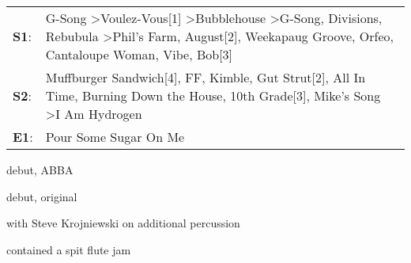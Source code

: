 {\begin{supertabular}{p{0.03\textwidth}p{0.97\textwidth}}
 \textbf{S1}:  &  G-Song\textsuperscript{} \textgreater \enspace Voulez-Vous[1]\textsuperscript{} \textgreater \enspace Bubblehouse\textsuperscript{} \textgreater \enspace G-Song\textsuperscript{}, \enspace Divisions\textsuperscript{}, \enspace Rebubula\textsuperscript{} \textgreater \enspace Phil's Farm\textsuperscript{}, \enspace August[2]\textsuperscript{}, \enspace Weekapaug Groove\textsuperscript{}, \enspace Orfeo\textsuperscript{}, \enspace Cantaloupe Woman\textsuperscript{}, \enspace Vibe\textsuperscript{}, \enspace Bob[3]\textsuperscript{}  \enspace  \\
 \textbf{S2}:  &                                                                                                                                                                   Muffburger Sandwich[4]\textsuperscript{}, \enspace FF\textsuperscript{}, \enspace Kimble\textsuperscript{}, \enspace Gut Strut[2]\textsuperscript{}, \enspace All In Time\textsuperscript{}, \enspace Burning Down the House\textsuperscript{}, \enspace 10th Grade[3]\textsuperscript{}, \enspace Mike's Song\textsuperscript{} \textgreater \enspace I Am Hydrogen\textsuperscript{}  \enspace  \\
 \textbf{E1}:  &                                                                                                                                                                                                                                                                                                                                                                                                                                                                                                                  Pour Some Sugar On Me\textsuperscript{}  \enspace  \\

\end{supertabular}
}{\item[] [1] debut, ABBA 
\item[] [2] debut, original 
\item[] [3] with Steve Krojniewski on additional percussion 
\item[] [4] contained a spit flute jam 
}{}{}
